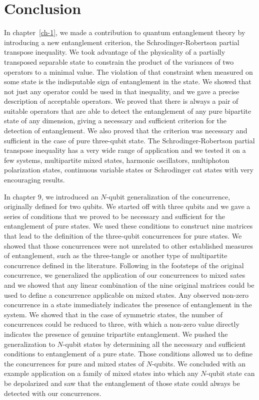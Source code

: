 \chapter*{Conclusion}

In chapter~\ref{ch-1}, we made a contribution to quantum entanglement theory by introducing a new entanglement criterion, the Schrodinger-Robertson partial transpose inequality. We took advantage of the physicality of a partially transposed separable state to constrain the product of the variances of two operators to a minimal value. The violation of that constraint when measured on some state is the indisputable sign of entanglement in the state. We showed that not just any operator could be used in that inequality, and we gave a precise description of acceptable operators. We proved that there is always a pair of suitable operators that are able to detect the entanglement of any pure bipartite state of any dimension, giving a necessary and sufficient criterion for the detection of entanglement. We also proved that the criterion was necessary and sufficient in the case of pure three-qubit state. The Schrodinger-Robertson partial transpose inequality has a very wide range of application and we tested it on a few systems, multipartite mixed states, harmonic oscillators, multiphoton polarization states, continuous variable states or Schrodinger cat states with very encouraging results.

In chapter 9, we introduced an $N$-qubit generalization of the concurrence, originally defined for two qubits. We started off with three qubits and we gave a series of conditions that we proved to be necessary and sufficient for the entanglement of pure states. We used these conditions to construct nine matrices that lead to the definition of the three-qubit concurrences for pure states. We showed that those concurrences were not unrelated to other established measures of entanglement, such as the three-tangle or another type of multipartite concurrence defined in the literature. Following in the footsteps of the original concurrence, we generalized the application of our concurrences to mixed sates and we showed that any linear combination of the nine original matrices could be used to define a concurrence applicable on mixed states. Any observed non-zero concurrence in a state immediately indicates the presence of entanglement in the system. We showed that in the case of symmetric states, the number of concurrences could be reduced to three, with which a non-zero value  directly indicates the presence of genuine tripartite entanglement. We pushed the generalization to $N$-qubit states by determining all the necessary and sufficient conditions to entanglement of a pure state. Those conditions allowed us to define the concurrences for pure and mixed states of $N$-qubits. We concluded with an example application on a family of mixed states into which any $N$-qubit state can be depolarized and saw that the entanglement of those state could always be detected with our concurrences.

